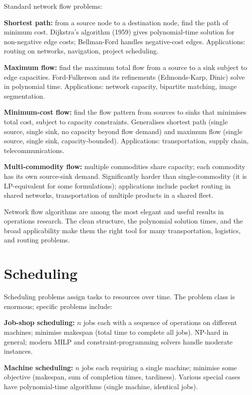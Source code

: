 Standard network flow problems:

\textbf{Shortest path:} from a source node to a destination node, find the path of minimum cost. Dijkstra's algorithm (1959) gives polynomial-time solution for non-negative edge costs; Bellman-Ford handles negative-cost edges. Applications: routing on networks, navigation, project scheduling.

\textbf{Maximum flow:} find the maximum total flow from a source to a sink subject to edge capacities. Ford-Fulkerson and its refinements (Edmonds-Karp, Dinic) solve in polynomial time. Applications: network capacity, bipartite matching, image segmentation.

\textbf{Minimum-cost flow:} find the flow pattern from sources to sinks that minimises total cost, subject to capacity constraints. Generalises shortest path (single source, single sink, no capacity beyond flow demand) and maximum flow (single source, single sink, capacity-bounded). Applications: transportation, supply chain, telecommunications.

\textbf{Multi-commodity flow:} multiple commodities share capacity; each commodity has its own source-sink demand. Significantly harder than single-commodity (it is LP-equivalent for some formulations); applications include packet routing in shared networks, transportation of multiple products in a shared fleet.

Network flow algorithms are among the most elegant and useful results in operations research. The clean structure, the polynomial solution times, and the broad applicability make them the right tool for many transportation, logistics, and routing problems.

\section{Scheduling}

Scheduling problems assign tasks to resources over time. The problem class is enormous; specific problems include:

\textbf{Job-shop scheduling:} $n$ jobs each with a sequence of operations on different machines; minimise makespan (total time to complete all jobs). NP-hard in general; modern MILP and constraint-programming solvers handle moderate instances.

\textbf{Machine scheduling:} $n$ jobs each requiring a single machine; minimise some objective (makespan, sum of completion times, tardiness). Various special cases have polynomial-time algorithms (single machine, identical jobs).

